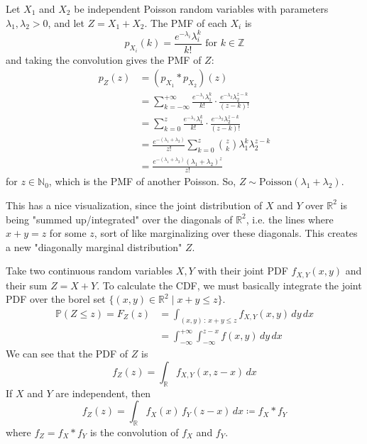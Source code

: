 \documentclass{article}
\begin{document}
      \begin{example}
        Let $X_1$ and $X_2$ be independent Poisson random variables with parameters $\lambda_1, \lambda_2 > 0$, and let $Z = X_1 + X_2$. The PMF of each $X_i$ is 
        \begin{equation}
          p_{X_i} (k) = \frac{e^{-\lambda_i} \lambda_i^k}{k!} \text{ for } k \in \mathbb{Z}
        \end{equation}
        and taking the convolution gives the PMF of $Z$: 
        \begin{align*}
          p_Z (z) & = (p_{X_1} \ast p_{X_2}) (z) \\
          & = \sum_{k=-\infty}^{+\infty} \frac{e^{-\lambda_1} \lambda_1^k}{k!} \cdot \frac{e^{-\lambda_2} \lambda_2^{z - k}}{(z - k)!} \\
          & = \sum_{k=0}^{z} \frac{e^{-\lambda_1} \lambda_1^k}{k!} \cdot \frac{e^{-\lambda_2} \lambda_2^{z - k}}{(z - k)!} \\ 
          & = \frac{e^{-(\lambda_1 + \lambda_2)}}{z!} \sum_{k=0}^z \binom{z}{k} \lambda_1^k \lambda_2^{z - k} \\
          & = \frac{e^{-(\lambda_1 + \lambda_2)} (\lambda_1 + \lambda_2)^z}{z!} 
        \end{align*}
        for $z \in \mathbb{N}_0$, which is the PMF of another Poisson. So, $Z \sim \mathrm{Poisson}(\lambda_1 + \lambda_2)$. 
      \end{example}

      This has a nice visualization, since the joint distribution of $X$ and $Y$ over $\mathbb{R}^2$ is being "summed up/integrated" over the diagonals of $\mathbb{R}^2$, i.e. the lines where $x + y = z$ for some $z$, sort of like marginalizing over these diagonals. This creates a new "diagonally marginal distribution" $Z$. 

      \begin{definition}
        Take two continuous random variables $X, Y$ with their joint PDF $f_{X, Y} (x, y)$ and their sum $Z = X + Y$. To calculate the CDF, we must basically integrate the joint PDF over the borel set $\{(x, y) \in \mathbb{R}^2 \mid x + y \leq z\}$. 
        \begin{align*}
          \mathbb{P}(Z \leq z) = F_Z (z) & = \int_{(x, y) \,:\, x + y \leq z} f_{X, Y} (x, y) \,dy\,dx \\
          & = \int_{-\infty}^{+\infty} \int_{-\infty}^{z - x} f(x, y) \,dy \,dx
        \end{align*}
        We can see that the PDF of $Z$ is 
        \begin{equation}
          f_{Z} (z) = \int_{\mathbb{R}} f_{X, Y} (x, z - x) \, dx
        \end{equation}
        If $X$ and $Y$ are independent, then 
        \begin{equation}
          f_{Z} (z) = \int_{\mathbb{R}} f_{X} (x) \, f_Y (z - x) \,dx \coloneqq f_X \ast f_Y
        \end{equation}
        where $f_Z = f_X \ast f_Y$ is the convolution of $f_X$ and $f_Y$. 
      \end{definition}
\end{document}
